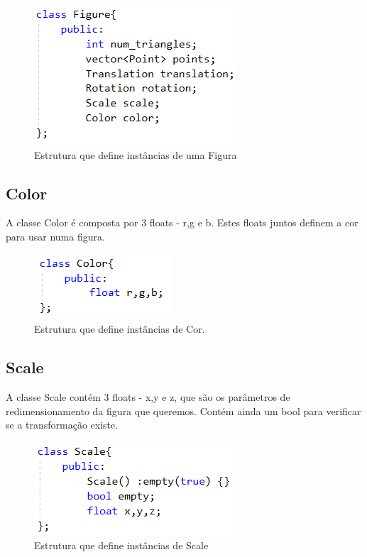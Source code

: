 \documentclass[a4paper]{article}
\begin{document}
\begin{figure}[H]
\centering
\includegraphics[scale=0.8]{figure.png}
\caption{Estrutura que define instâncias de uma Figura}
\label{img:Figure}
\end{figure}


\subsection{Color}
\label{sec:color}

A classe Color é composta por 3 floats - r,g e b. Estes floats juntos definem a cor para usar numa figura.

\begin{figure}[H]
\centering
\includegraphics[scale=0.8]{color.png}
\caption{Estrutura que define instâncias de Cor.}
\label{img:Color}
\end{figure}


\subsection{Scale}
\label{sec:scale}

A classe Scale contém 3 floats - x,y e z, que são os parâmetros de redimensionamento da figura que queremos. Contém ainda um bool para verificar se a transformação existe.

\begin{figure}[H]
\centering
\includegraphics[scale=0.8]{scale.png}
\caption{Estrutura que define instâncias de Scale}
\label{img:Scale}
\end{figure}
\end{document}
